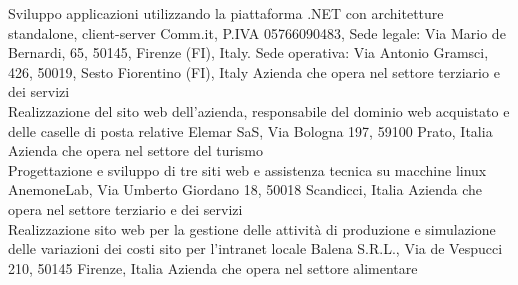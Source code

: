 \documentclass[totpages,openbib,italian]{europecv}
\begin{document}


\begin{europecv}
\ecvpersonalinfo[20pt]


{Sviluppo applicazioni utilizzando la piattaforma .NET con
  architetture standalone, client-server }
{Comm.it, P.IVA 05766090483, Sede legale: Via Mario de Bernardi, 65,
  50145, Firenze (FI), Italy. Sede operativa: Via Antonio Gramsci,
  426,
  50019, Sesto Fiorentino (FI), Italy }
{Azienda che opera nel settore terziario e dei servizi}
\\
{Realizzazione del sito web dell’azienda,
  responsabile del dominio web acquistato e delle caselle di posta relative}
{Elemar SaS, Via Bologna 197, 59100 Prato, Italia}
{Azienda che opera nel settore del turismo}
\\
{Progettazione e sviluppo di tre siti web e assistenza tecnica su
  macchine linux}
{AnemoneLab, Via Umberto Giordano 18, 50018 Scandicci, Italia}
{Azienda che opera nel settore terziario e dei servizi}
\\
{Realizzazione sito web per la gestione delle attivit\`a di produzione
  e simulazione delle variazioni dei costi sito per l'intranet locale}
{Balena S.R.L., Via de Vespucci 210, 50145 Firenze, Italia}
{Azienda che opera nel settore alimentare}
\\

\end{europecv}
\end{document}
